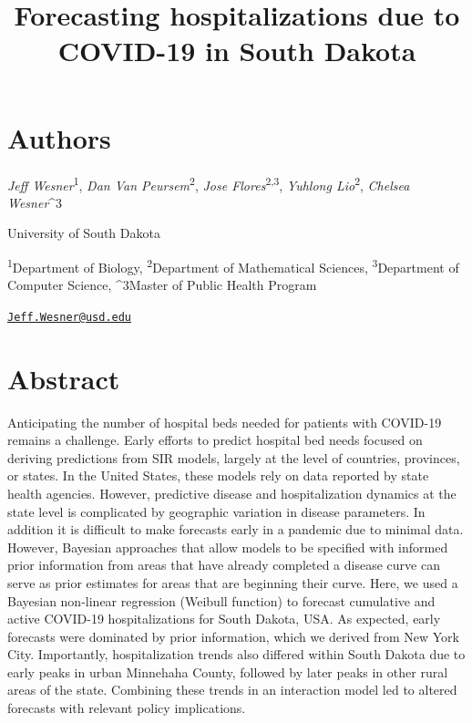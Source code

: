 \documentclass[
]{article}
\title{Forecasting hospitalizations due to COVID-19 in South Dakota}
\author{}
\date{\vspace{-2.5em}}
\begin{document}
\maketitle

\hypertarget{authors}{%
\section{Authors}\label{authors}}

\emph{Jeff Wesner}\textsuperscript{1}, \emph{Dan Van Peursem}\textsuperscript{2}, \emph{Jose Flores}\textsuperscript{2,3}, \emph{Yuhlong Lio}\textsuperscript{2}, \emph{Chelsea Wesner}\^{}3

University of South Dakota

\textsuperscript{1}Department of Biology, \textsuperscript{2}Department of Mathematical Sciences, \textsuperscript{3}Department of Computer Science, \^{}3Master of Public Health Program

\href{mailto:Jeff.Wesner@usd.edu}{\nolinkurl{Jeff.Wesner@usd.edu}}

\hypertarget{abstract}{%
\section{Abstract}\label{abstract}}

Anticipating the number of hospital beds needed for patients with COVID-19 remains a challenge. Early efforts to predict hospital bed needs focused on deriving predictions from SIR models, largely at the level of countries, provinces, or states. In the United States, these models rely on data reported by state health agencies. However, predictive disease and hospitalization dynamics at the state level is complicated by geographic variation in disease parameters. In addition it is difficult to make forecasts early in a pandemic due to minimal data. However, Bayesian approaches that allow models to be specified with informed prior information from areas that have already completed a disease curve can serve as prior estimates for areas that are beginning their curve. Here, we used a Bayesian non-linear regression (Weibull function) to forecast cumulative and active COVID-19 hospitalizations for South Dakota, USA. As expected, early forecasts were dominated by prior information, which we derived from New York City. Importantly, hospitalization trends also differed within South Dakota due to early peaks in urban Minnehaha County, followed by later peaks in other rural areas of the state. Combining these trends in an interaction model led to altered forecasts with relevant policy implications.
\end{document}
